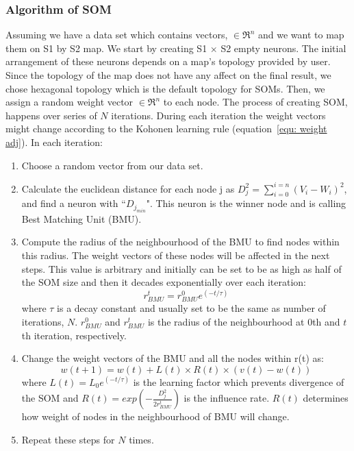  \subsubsection{Algorithm of SOM} 
 \label{sec: algorithm}
     Assuming we have a data set which contains vectors,  $\in \Re^n$ and we want to map them on S1 by S2 map. 
     We start by creating S1 $\times$ S2 empty neurons. 
     The initial arrangement of these neurons depends on a map's topology provided by user.
     Since the topology of the map does not have any affect on the final result, we chose hexagonal topology which is the default topology for SOMs.
     Then, we assign a random weight vector  $\in \Re^n$ to each node.
     The process of creating SOM, happens over series of $N$ iterations. 
     During each iteration the weight vectors might change according to the Kohonen learning rule (equation~\ref{equ: weight adj}). 
      In each iteration:
     \begin{enumerate}
        \item Choose a random vector from our data set.
        \item Calculate the euclidean distance for each node j as  $D_j^2= \sum_{i=0}^{i=n} (V_i - W_i)^2$, and find a neuron with ``$D_{j_{min}}$". This neuron is the winner node and is calling Best Matching Unit (BMU). 
        \item  Compute the radius of the neighbourhood of the BMU to find nodes within this radius. The weight vectors of these nodes will be affected in the next steps. This value is arbitrary and initially can be set to be as high as half of the SOM size and then it decades exponentially over each iteration:
        \begin{equation}
            r^t_{BMU} = r^0_{BMU}e^{(-t/\tau)}
        \end{equation}
        where $\tau$ is a decay constant and usually set to be the same as number of iterations, $N$. $r^0_{BMU}$ and $r^t_{BMU}$ is the radius of the neighbourhood at 0th and $t$th iteration, respectively. 
        \item Change the weight vectors of the BMU and all the nodes within r(t) as:
        \begin{equation}
            \label{equ: weight adj}
            w(t+1)=w(t)+L(t) \times R(t) \times(v(t)-w(t))
        \end{equation}
        where $L(t) = L_0 e^{(-t/\tau)}$ is the learning factor which prevents divergence of the SOM and $R(t)=exp(-\frac{D_j^2}{2r^t_{BMU}})$ is the influence rate. $R(t)$ determines how weight of nodes in the neighbourhood of BMU will change.
        \item  Repeat these steps for $N$ times.
     \end{enumerate}
   
